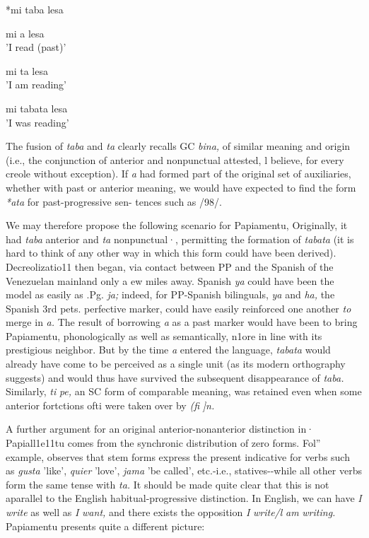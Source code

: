 \ea\label{ex:95}
 {*mi} {taba} {lesa} 
\z

\ea\label{ex:96}
mi a lesa\\
\glt'I read (past)'
\z



\ea\label{ex:97}
mi ta lesa\\
\glt 'I am reading'
\z


\ea\label{ex:98}
mi tabata lesa\\
\glt 'I was reading'
\z

The fusion of \textit{taba} and \textit{ta} clearly recalls GC \textit{bina,} of similar meaning and origin (i.e., the conjunction of anterior and nonpunctual attested, l believe, for every creole without exception). If \textit{a} had formed part of the original set of auxiliaries, whether with past or anterior meaning, we would have expected to find the form \textit{*ata} for past-progressive sen- tences such as /98/.

We may therefore propose the following scenario for Papia\-mentu, Originally, it had \textit{taba} anterior and \textit{ta} nonpunctual·, permitting the formation of \textit{tabata} (it is hard to think of any other way in which this form could have been derived). Decreolizatio11 then began, via contact between PP and the Spanish of the Venezuelan mainland only a ew miles away. Spanish \textit{ya }could have been the model as easily as .Pg. \textit{ja;} indeed, for PP-Spanish bilinguals, \textit{ya }and \textit{ha,} the Spanish 3rd pets. perfective marker, could have easily reinforced one another \textit{to} merge in \textit{a.} The result of borrowing \textit{a} as a past marker would have been to bring Papiamentu, phonologically as well as semantically, n1ore in line with its prestigious neighbor. But by the time \textit{a} entered the language, \textit{tabata} would already have come to be perceived as a single unit (as its modern orthography suggests) and would thus have survived the subsequent disappearance of \textit{taba. }Similarly, \textit{ti} \textit{pe, }an SC form of comparable meaning, was retained even when some anterior fortctions ofti were taken over by \textit{(}\textit{fi} \textit{]n.}

A further argument for an original anterior-nonanterior distinc\-tion in· Papiall1e11tu comes from the synchronic distribution of zero forms. Fol'' example, \citet[107]{Goilo1953} observes that stem forms express the present indicative for verbs such as \textit{gusta} 'like', \textit{quier} 'love', \textit{jama} 'be called', etc.-i.e., statives-{}-while all other verbs form the same tense with \textit{ta.} It should be made quite clear that this is not aparallel to the English habitual-progressive distinction. In English,
we can have \textit{I} \textit{write} as well as \textit{I} \textit{want,} and there exists the opposition
\textit{I} \textit{write/l} \textit{am} \textit{writing.} Papiamentu presents quite a different picture:


